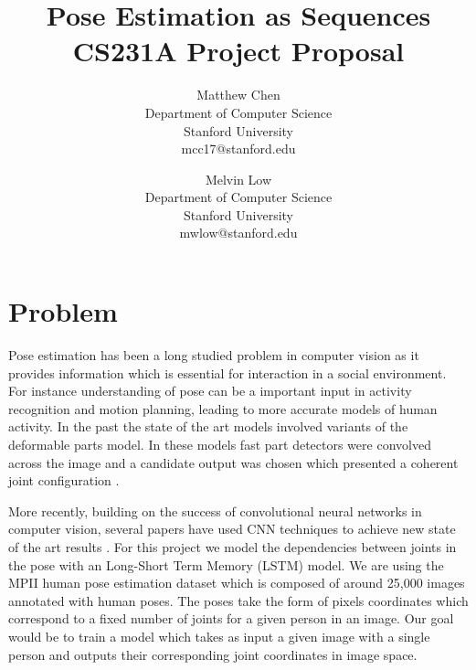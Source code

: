 \documentclass[12pt]{article}
\begin{document}
\title{Pose Estimation as Sequences \\ \small CS231A Project Proposal}
\author{Matthew Chen\\
  \small \vspace{-2mm} Department of Computer Science\\
  \small \vspace{-2mm} Stanford University\\
  \small mcc17@stanford.edu
  \and
  Melvin Low\\
  \small \vspace{-2mm} Department of Computer Science\\
  \small \vspace{-2mm} Stanford University\\
  \small mwlow@stanford.edu}

\date{}
\maketitle

\section{Problem}


Pose estimation has been a long studied problem in computer vision as it provides information which is essential for interaction in a social environment. For instance understanding of pose can be a important input in activity recognition and motion planning, leading to more accurate models of human activity. In the past the state of the art models involved variants of the deformable parts model. In these models fast part detectors were convolved across the image and a candidate output was chosen which presented a coherent joint configuration \cite{felzenszwalb2010object}.

More recently, building on the success of convolutional neural networks in computer vision, several papers have used CNN techniques to achieve new state of the art results \cite{toshev2014deeppose} \cite{carreira2015human} \cite{pishchulin2015deepcut} \cite{wei2016convolutional} \cite{newell2016stacked}. For this project we model the dependencies between joints in the pose with an Long-Short Term Memory (LSTM) model. We are using the MPII human pose estimation dataset which is composed of around 25,000 images annotated with human poses. The poses take the form of pixels coordinates which correspond to a fixed number of joints for a given person in an image. Our goal would be to train a model which takes as input a given image with a single person and outputs their corresponding joint coordinates in image space.
\end{document}
